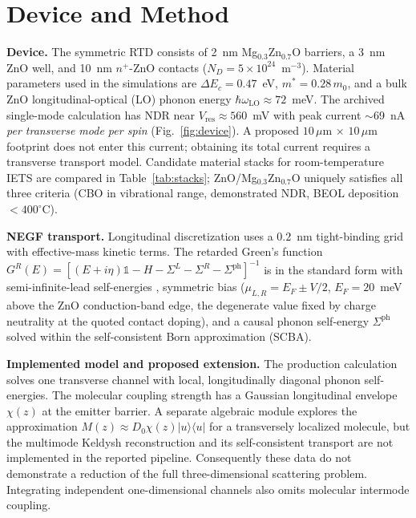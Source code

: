 \documentclass[conference]{IEEEtran}
\begin{document}

\section{Device and Method}
\textbf{Device.} The symmetric RTD consists of 2~nm Mg$_{0.3}$Zn$_{0.7}$O barriers, a 3~nm ZnO well, and 10~nm $n^+$-ZnO contacts ($N_D = 5\times10^{24}$~m$^{-3}$). Material parameters used in the simulations are $\Delta E_c = 0.47$~eV, $m^* = 0.28\, m_0$, and a bulk ZnO longitudinal-optical (LO) phonon energy $\hbar\omega_{\mathrm{LO}} \approx 72$~meV. The archived single-mode calculation has NDR near $V_{\mathrm{res}} \approx 560$~mV with peak current $\sim$69~nA \emph{per transverse mode per spin} (Fig.~\ref{fig:device}). A proposed $10\,\mu$m $\times$ $10\,\mu$m footprint does not enter this current; obtaining its total current requires a transverse transport model. Candidate material stacks for room-temperature IETS are compared in Table~\ref{tab:stacks}; ZnO/Mg$_{0.3}$Zn$_{0.7}$O uniquely satisfies all three criteria (CBO in vibrational range, demonstrated NDR, BEOL deposition $<400^\circ$C).

\textbf{NEGF transport.} Longitudinal discretization uses a $0.2$~nm tight-binding grid with effective-mass kinetic terms. The retarded Green's function $G^R(E) = [(E + i\eta)\mathbb{1} - H - \Sigma^L - \Sigma^R - \Sigma^{\mathrm{ph}}]^{-1}$ is in the standard form with semi-infinite-lead self-energies \cite{datta_textbook}, symmetric bias ($\mu_{L,R} = E_F \pm V/2$, $E_F = 20$~meV above the ZnO conduction-band edge, the degenerate value fixed by charge neutrality at the quoted contact doping), and a causal phonon self-energy $\Sigma^{\mathrm{ph}}$ solved within the self-consistent Born approximation (SCBA). 

\textbf{Implemented model and proposed extension.} The production calculation solves one transverse channel with local, longitudinally diagonal phonon self-energies. The molecular coupling strength has a Gaussian longitudinal envelope $\chi(z)$ at the emitter barrier. A separate algebraic module explores the approximation $M(z)\approx D_0\chi(z)|u\rangle\langle u|$ for a transversely localized molecule, but the multimode Keldysh reconstruction and its self-consistent transport are not implemented in the reported pipeline. Consequently these data do not demonstrate a reduction of the full three-dimensional scattering problem. Integrating independent one-dimensional channels also omits molecular intermode coupling.
\end{document}
